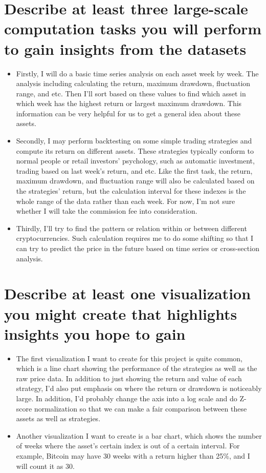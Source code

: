 \documentclass[a4paper]{article}
\begin{document}
\section{Describe at least three large-scale computation tasks you will perform to gain insights from the datasets}
\begin{itemize}
    \item Firstly, I will do a basic time series analysis on each asset week by week. The analysis including calculating the return, maximum drawdown, fluctuation range, and etc. Then I'll sort based on these values to find which asset in which week has the highest return or largest maximum drawdown. This information can be very helpful for us to get a general idea about these assets.
    \item Secondly, I may perform backtesting on some simple trading strategies and compute its return on different assets. These strategies typically conform to normal people or retail investors' psychology, such as automatic investment, trading based on last week's return, and etc. Like the first task, the return, maximum drawdown, and fluctuation range will also be calculated based on the strategies' return, but the calculation interval for these indexes is the whole range of the data rather than each week. For now, I'm not sure whether I will take the commission fee into consideration.
    \item Thirdly, I'll try to find the pattern or relation within or between different cryptocurrencies. Such calculation requires me to do some shifting so that I can try to predict the price in the future based on time series or cross-section analysis.
\end{itemize}
\section{Describe at least one visualization you might create that highlights insights you hope to gain}
\begin{itemize}
    \item The first visualization I want to create for this project is quite common, which is a line chart showing the performance of the strategies as well as the raw price data. In addition to just showing the return and value of each strategy, I'd also put emphasis on where the return or drawdown is noticeably large. In addition, I'd probably change the axis into a log scale and do Z-score normalization so that we can make a fair comparison between these assets as well as strategies.
    \item Another visualization I want to create is a bar chart, which shows the number of weeks where the asset's certain index is out of a certain interval. For example, Bitcoin may have 30 weeks with a return higher than 25\%, and I will count it as 30.
\end{itemize}
\end{document}
